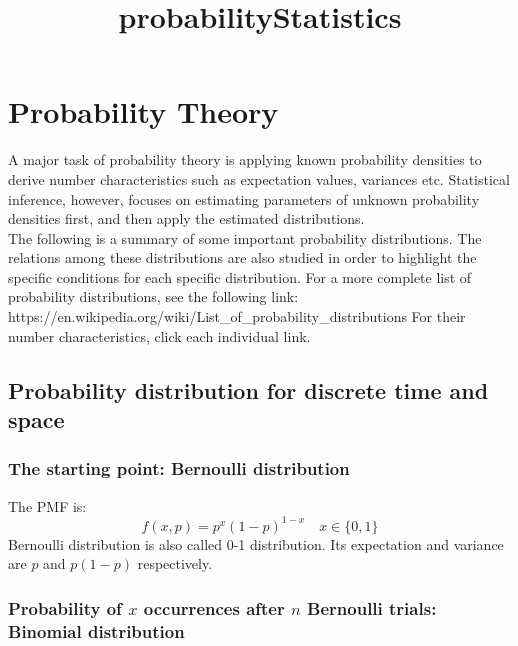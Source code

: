\documentclass[11pt]{article}
\title{probabilityStatistics}
\begin{document}
    
    
    \maketitle
    
    

    
    \section{Probability Theory}\label{probability-theory}

A major task of probability theory is applying known probability
densities to derive number characteristics such as expectation values,
variances etc. Statistical inference, however, focuses on estimating
parameters of unknown probability densities first, and then apply the
estimated distributions.\\
The following is a summary of some important probability distributions.
The relations among these distributions are also studied in order to
highlight the specific conditions for each specific distribution. For a
more complete list of probability distributions, see the following link:
https://en.wikipedia.org/wiki/List\_of\_probability\_distributions For
their number characteristics, click each individual link.

\subsection{Probability distribution for discrete time and
space}\label{probability-distribution-for-discrete-time-and-space}

\subsubsection{The starting point: Bernoulli
distribution}\label{the-starting-point-bernoulli-distribution}

The PMF is: \[f(x,p) = p^x(1-p)^{1-x}  \quad x \in \{0, 1\}\] Bernoulli
distribution is also called 0-1 distribution. Its expectation and
variance are \(p\) and \(p(1-p)\) respectively.

\subsubsection{\texorpdfstring{Probability of \(x\) occurrences after
\(n\) Bernoulli trials: Binomial
distribution}{Probability of x occurrences after n Bernoulli trials: Binomial distribution}}\label{probability-of-x-occurrences-after-n-bernoulli-trials-binomial-distribution}
\end{document}
